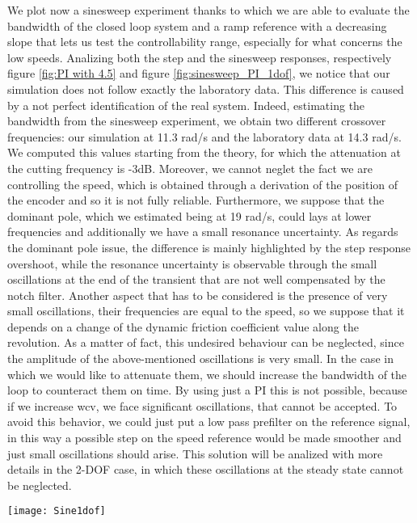We plot now a sinesweep experiment thanks to which we are able to evaluate the bandwidth of the closed loop system and a ramp reference with a decreasing slope that lets us test the controllability range, especially for what concerns the low speeds. 
Analizing both the step and the sinesweep responses, respectively figure \ref{fig:PI with 4.5} and figure \ref{fig:sinesweep_PI_1dof}, we notice that our simulation does not follow exactly the laboratory data. This difference is caused by a not perfect identification of the real system. Indeed, estimating the bandwidth from the sinesweep experiment, we obtain two different crossover frequencies: our simulation at 11.3 rad/s and the laboratory data at 14.3 rad/s. We computed this values starting from the theory, for which the attenuation at the cutting frequency is -3dB. Moreover, we cannot neglet the fact we are controlling the speed, which is obtained through a derivation of the position of the encoder and so it is not fully reliable. Furthermore, we suppose that the dominant pole, which we estimated being at 19 rad/s, could lays at lower frequencies and additionally we have a small resonance uncertainty. As regards the dominant pole issue, the difference is mainly highlighted by the step response overshoot, while the resonance uncertainty is observable through the small oscillations at the end of the transient that are not well compensated by the notch filter.
Another aspect that has to be considered is the presence of very small oscillations, their frequencies are equal to the speed, so we suppose that it depends on a change of the dynamic friction coefficient value along the revolution. As a matter of fact, this undesired behaviour can be neglected, since the amplitude of the above-mentioned oscillations is very small. In the case in which we would like to attenuate them, we should increase the bandwidth of the loop to counteract them on time. By using just a PI this is not possible, because if we increase wcv, we face significant oscillations, that cannot be accepted. To avoid this behavior, we could just put a low pass prefilter on the reference signal, in this way a possible step on the speed reference would be made smoother and just small oscillations should arise. This solution will be analized with more details in the 2-DOF case, in which these oscillations at the steady state cannot be neglected.
\newpage
\begin{figure*}[h]
	\centering
	\texttt{[image: Sine1dof]}
	\caption{Sinesweep experiment from 0.1 Hz to 10 Hz in 100s}
	\label{fig:sinesweep_PI_1dof}
\end{figure*}

